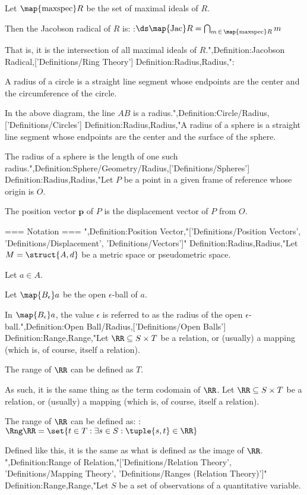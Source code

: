Let $\map {\operatorname{maxspec}} R$ be the set of maximal ideals of $R$.


Then the Jacobson radical of $R$ is:
:$\ds \map {\operatorname {Jac} } R = \bigcap_{m \mathop \in \map {\operatorname{maxspec}} R} m$

That is, it is the intersection of all maximal ideals of $R$.",Definition:Jacobson Radical,['Definitions/Ring Theory']
Definition:Radius,Radius,":

A radius of a circle is a straight line segment whose endpoints are the center and the circumference of the circle.

In the above diagram, the line $AB$ is a radius.",Definition:Circle/Radius,['Definitions/Circles']
Definition:Radius,Radius,"A radius of a sphere is a straight line segment whose endpoints are the center and the surface of the sphere.

The radius of a sphere is the length of one such radius.",Definition:Sphere/Geometry/Radius,['Definitions/Spheres']
Definition:Radius,Radius,"Let $P$ be a point in a given frame of reference whose origin is $O$.

The position vector $\mathbf p$ of $P$ is the displacement vector of $P$ from $O$.


=== Notation ===
",Definition:Position Vector,"['Definitions/Position Vectors', 'Definitions/Displacement', 'Definitions/Vectors']"
Definition:Radius,Radius,"Let $M = \struct {A, d}$ be a metric space or pseudometric space.

Let $a \in A$.

Let $\map {B_\epsilon} a$ be the open $\epsilon$-ball of $a$.


In $\map {B_\epsilon} a$, the value $\epsilon$ is referred to as the radius of the open $\epsilon$-ball.",Definition:Open Ball/Radius,['Definitions/Open Balls']
Definition:Range,Range,"Let $\RR \subseteq S \times T$ be a relation, or (usually) a mapping (which is, of course, itself a relation).


The range of $\RR$ can be defined as $T$.

As such, it is the same thing as the term codomain of $\RR$.
Let $\RR \subseteq S \times T$ be a relation, or (usually) a mapping (which is, of course, itself a relation).


The range of $\RR$ can be defined as:
:$\Rng \RR = \set {t \in T: \exists s \in S: \tuple {s, t} \in \RR}$

Defined like this, it is the same as what is defined as the image of $\RR$.
",Definition:Range of Relation,"['Definitions/Relation Theory', 'Definitions/Mapping Theory', 'Definitions/Ranges (Relation Theory)']"
Definition:Range,Range,"Let $S$ be a set of observations of a quantitative variable.


